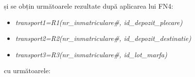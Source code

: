 \documentclass[12pt, a4paper]{article}
\begin{document}
și se obțin următoarele rezultate după aplicarea lui FN4:

\begin{itemize}
    \item \emph{transport1=R1(nr\_inmatriculare\#, id\_depozit\_plecare)}
    \item \emph{transport2=R2(nr\_inmatriculare\#, id\_depozit\_destinatie)}
    \item \emph{transport3=R3(nr\_inmatriculare\#, id\_lot\_marfa)}
\end{itemize}

cu următoarele:

\begin{table}[!htbp]
\begin{center}
    \caption{Relația \emph{transport1}}\label{tab14-1}
\end{center}
\end{table}

\begin{table}[!htbp]
\begin{center}
    \caption{Relația \emph{transport2}}\label{tab14-2}
\end{center}
\end{table}

\begin{table}[!htbp]
\begin{center}
    \caption{Relația \emph{transport3}}\label{tab14-3}
\end{center}
\end{table}
\end{document}
